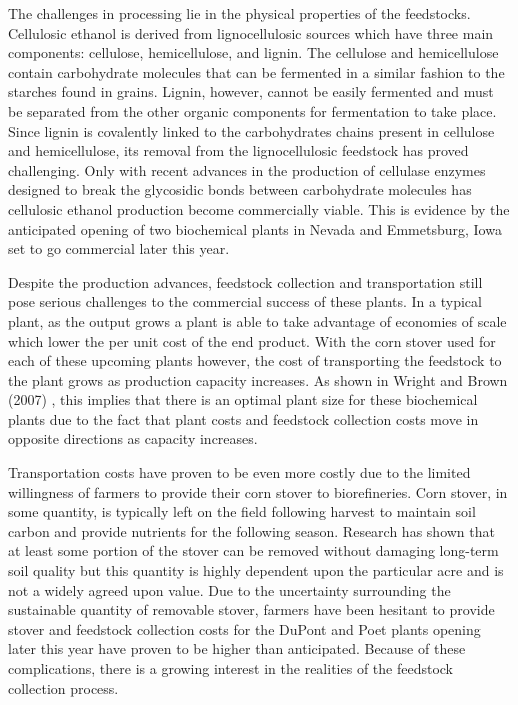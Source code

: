 \documentclass[12pt]{article}\usepackage[]{graphicx}\usepackage[]{color}
\begin{document}
The challenges in processing lie in the physical properties of the feedstocks.  Cellulosic ethanol is derived from lignocellulosic sources which have three main components: cellulose, hemicellulose, and lignin.  The cellulose and hemicellulose contain carbohydrate molecules that can be fermented in a similar fashion to the starches found in grains.  Lignin, however, cannot be easily fermented and must be separated from the other organic components for fermentation to take place.  Since lignin is covalently linked to the carbohydrates chains present in cellulose and hemicellulose, its removal from the lignocellulosic feedstock has proved challenging.  Only with recent advances in the production of cellulase enzymes designed to break the glycosidic bonds between carbohydrate molecules has cellulosic ethanol production become commercially viable.  This is evidence by the anticipated opening of two biochemical plants in Nevada and Emmetsburg, Iowa set to go commercial later this year.

Despite the production advances, feedstock collection and transportation still pose serious challenges to the commercial success of these plants.  In a typical plant, as the output grows a plant is able to take advantage of economies of scale which lower the per unit cost of the end product.  With the corn stover used for each of these upcoming plants however, the cost of transporting the feedstock to the plant grows as production capacity increases.  As shown in Wright and Brown (2007) \cite{Wright and Brown}, this implies that there is an optimal plant size for these biochemical plants due to the fact that plant costs and feedstock collection costs move in opposite directions as capacity increases.

Transportation costs have proven to be even more costly due to the limited willingness of farmers to provide their corn stover to biorefineries.  Corn stover, in some quantity, is typically left on the field following harvest to maintain soil carbon and provide nutrients for the following season.  Research has shown that at least some portion of the stover can be removed without damaging long-term soil quality but this quantity is highly dependent upon the particular acre and is not a widely agreed upon value.  Due to the uncertainty surrounding the sustainable quantity of removable stover, farmers have been hesitant to provide stover and feedstock collection costs for the DuPont and Poet plants opening later this year have proven to be higher than anticipated.  Because of these complications, there is a growing interest in the realities of the feedstock collection process.
\end{document}
